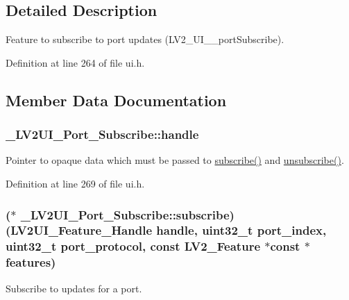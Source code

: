 \subsection{Detailed Description}
Feature to subscribe to port updates (L\+V2\+\_\+\+U\+I\+\_\+\+\_\+port\+Subscribe). 

Definition at line 264 of file ui.\+h.



\subsection{Member Data Documentation}
\subsubsection[{\texorpdfstring{handle}{handle}}]{ \+\_\+\+L\+V2\+U\+I\+\_\+\+Port\+\_\+\+Subscribe\+::handle}\hypertarget{struct___l_v2_u_i___port___subscribe_a0028423b1b8309a518b5c1ac638920bc}{}\label{struct___l_v2_u_i___port___subscribe_a0028423b1b8309a518b5c1ac638920bc}
Pointer to opaque data which must be passed to \hyperlink{struct___l_v2_u_i___port___subscribe_a06151d1866ab7e657434c69cf6e8b471}{subscribe()} and \hyperlink{struct___l_v2_u_i___port___subscribe_a82e2510deaba2a0b9e6039e0a84db538}{unsubscribe()}. 

Definition at line 269 of file ui.\+h.

\subsubsection[{\texorpdfstring{subscribe}{subscribe}}]{($\ast$ \+\_\+\+L\+V2\+U\+I\+\_\+\+Port\+\_\+\+Subscribe\+::subscribe) ({\bf L\+V2\+U\+I\+\_\+\+Feature\+\_\+\+Handle} {\bf handle}, {\bf uint32\+\_\+t} port\+\_\+index, {\bf uint32\+\_\+t} port\+\_\+protocol, {\bf const} {\bf L\+V2\+\_\+\+Feature} $\ast${\bf const} $\ast$features)}\hypertarget{struct___l_v2_u_i___port___subscribe_a06151d1866ab7e657434c69cf6e8b471}{}\label{struct___l_v2_u_i___port___subscribe_a06151d1866ab7e657434c69cf6e8b471}
Subscribe to updates for a port.

